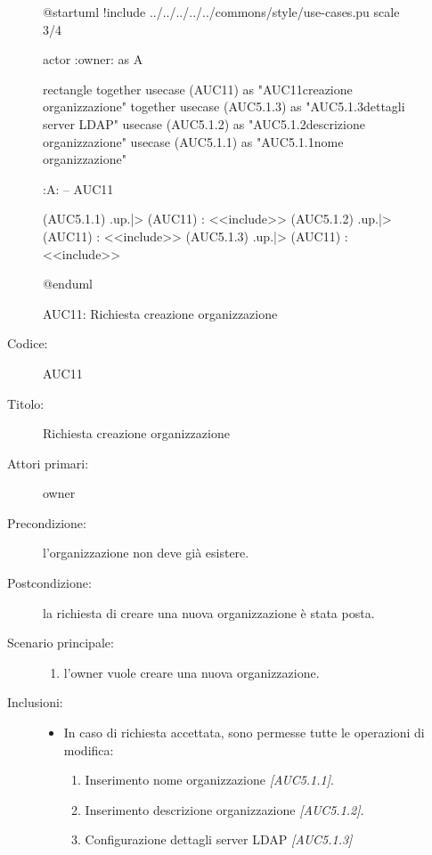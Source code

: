 \documentclass[../../../analisi-dei-requisiti.tex]{subfiles}
\begin{document}
\begin{figure}[h!]
  \centering
  \begin{plantuml}
  @startuml
  !include ../../../../../commons/style/use-cases.pu
  scale 3/4

  actor :owner: as A

  rectangle {
    together {
      usecase (AUC11) as "AUC11\nRichiesta creazione organizzazione"
    }
    together {
      usecase (AUC5.1.3) as "AUC5.1.3\nConfigurazione dettagli server LDAP"
      usecase (AUC5.1.2) as "AUC5.1.2\nInserisci descrizione organizzazione"
      usecase (AUC5.1.1) as "AUC5.1.1\nInserisci nome organizzazione"
    }
  }

  :A: -- AUC11

  (AUC5.1.1) .up.|> (AUC11) : <<include>>
  (AUC5.1.2) .up.|> (AUC11) : <<include>>
  (AUC5.1.3) .up.|> (AUC11) : <<include>>

  @enduml
  \end{plantuml}
  \caption{AUC11: Richiesta creazione organizzazione}
  \label{fig:auc11}
\end{figure}

\begin{description}
  \item[Codice:] AUC11
  \item[Titolo:] Richiesta creazione organizzazione
  \item[Attori primari:] owner
  \item[Precondizione:] l'organizzazione non deve già esistere.
  \item[Postcondizione:] la richiesta di creare una nuova organizzazione è stata posta.
  \item[Scenario principale:]
  \begin{enumerate}
    \item l'owner vuole creare una nuova organizzazione.
  \end{enumerate}
  \item[Inclusioni:]
  \begin{itemize}
    \item In caso di richiesta accettata, sono permesse tutte le operazioni di modifica:
    \begin{enumerate}
      \item Inserimento nome organizzazione \emph{[AUC5.1.1]}.
      \item Inserimento descrizione organizzazione \emph{[AUC5.1.2]}.
      \item Configurazione dettagli server LDAP \emph{[AUC5.1.3]}
    \end{enumerate}
  \end{itemize}
\end{description}
\end{document}
